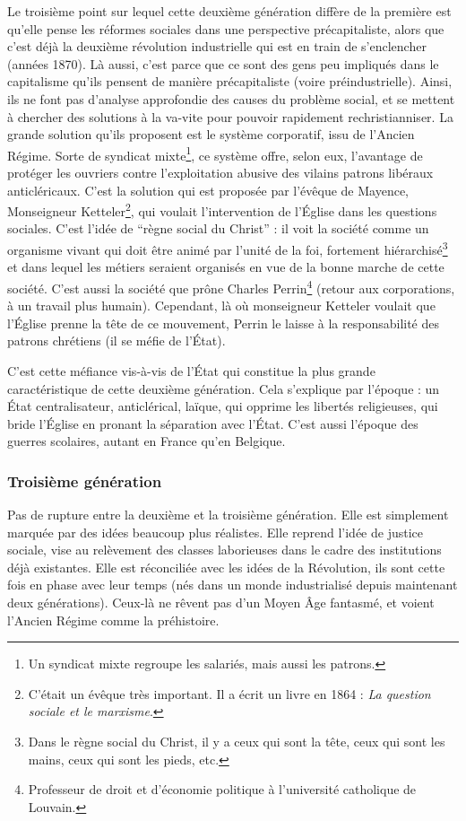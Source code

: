 \documentclass[12pt]{report}
\begin{document}
Le troisième point sur lequel cette deuxième génération diffère de la première est qu'elle pense les réformes sociales dans une perspective précapitaliste, alors que c'est déjà la deuxième révolution industrielle qui est en train de s'enclencher (années 1870). Là aussi, c'est parce que ce sont des gens peu impliqués dans le capitalisme qu'ils pensent de manière précapitaliste (voire préindustrielle).
Ainsi, ils ne font pas d'analyse approfondie des causes du problème social, et se mettent à chercher des solutions à la va-vite pour pouvoir rapidement rechristianniser.
La grande solution qu'ils proposent est le système corporatif, issu de l'Ancien Régime. Sorte de syndicat mixte\footnote{Un syndicat mixte regroupe les salariés, mais aussi les patrons.}, ce système offre, selon eux, l'avantage de protéger les ouvriers contre l'exploitation abusive des vilains patrons libéraux anticléricaux.
C'est la solution qui est proposée par l'évêque de Mayence, Monseigneur Ketteler\footnote{C'était un évêque très important. Il a écrit un livre en 1864 : \emph{La question sociale et le marxisme}.}, qui voulait l'intervention de l'Église dans les questions sociales. C'est l'idée de \enquote{règne social du Christ} : il voit la société comme un organisme vivant qui doit être animé par l'unité de la foi, fortement hiérarchisé\footnote{Dans le règne social du Christ, il y a ceux qui sont la tête, ceux qui sont les mains, ceux qui sont les pieds, etc.} et dans lequel les métiers seraient organisés en vue de la bonne marche de cette société.
C'est aussi la société que prône Charles Perrin\footnote{Professeur de droit et d'économie politique à l'université catholique de Louvain.} (retour aux corporations, à un travail plus humain). Cependant, là où monseigneur Ketteler voulait que l'Église prenne la tête de ce mouvement, Perrin le laisse à la responsabilité des patrons chrétiens (il se méfie de l'État).

C'est cette méfiance vis-à-vis de l'État qui constitue la plus grande caractéristique de cette deuxième génération. Cela s'explique par l'époque : un État centralisateur, anticlérical, laïque, qui opprime les libertés religieuses, qui bride l'Église en pronant la séparation avec l'État. C'est aussi l'époque des guerres scolaires, autant en France qu'en Belgique.

\subsubsection{Troisième génération}

Pas de rupture entre la deuxième et la troisième génération. Elle est simplement marquée par des idées beaucoup plus réalistes. Elle reprend l'idée de justice sociale, vise au relèvement des classes laborieuses dans le cadre des institutions déjà existantes. Elle est réconciliée avec les idées de la Révolution, ils sont cette fois en phase avec leur temps (nés dans un monde industrialisé depuis maintenant deux générations).
Ceux-là ne rêvent pas d'un Moyen Âge fantasmé, et voient l'Ancien Régime comme la préhistoire.
\end{document}
